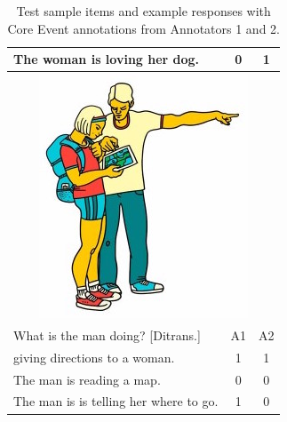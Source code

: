 \documentclass[11pt,a4paper]{article}
\begin{document}
\begin{table}[t!]
\begin{center}
\begin{tabular}{|l|c|c|}
\hline
The woman is loving her dog. & 0 & 1 \\
\hline
\hline
\multicolumn{3}{|c|}{\includegraphics[width=0.5\columnwidth]{figures/I28.jpg}} \\
\hline
What is the man doing? [Ditrans.] & A1 & A2 \\
\hline
giving directions to a woman. & 1 & 1 \\
\hline
The man is reading a map. & 0 & 0 \\
\hline
The man is is telling her where to go. & 1 & 0 \\
\hline
\end{tabular}
\caption{\label{tab:test-sample-items} Test sample items and example responses with Core Event annotations from Annotators 1 and 2.}
\end{center}
\end{table}
\end{document}
